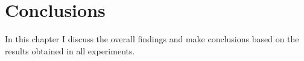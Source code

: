 \cleardoublepage

\chapter{Conclusions}
\label{colcusionschapter}

In this chapter I discuss the overall findings and make conclusions based on the results obtained in all experiments.




